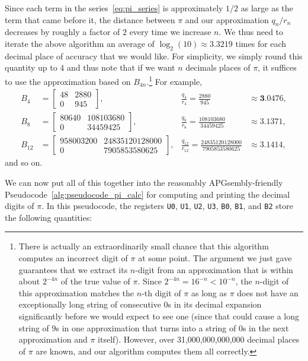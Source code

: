Since each term in the series~\eqref{eq:pi_series} is approximately $1/2$ as large as the term that came before it, the distance between $\pi$ and our approximation $q_n/r_n$ decreases by roughly a factor of $2$ every time we increase $n$. We thus need to iterate the above algorithm an average of $\log_2(10) \approx 3.3219$ times for each decimal place of accuracy that we would like. For simplicity, we simply round this quantity up to $4$ and thus note that if we want $n$ decimals places of $\pi$, it suffices to use the approximation based on $B_{4n}$.\footnote{There is actually an extraordinarily small chance that this algorithm computes an incorrect digit of $\pi$ at some point. The argument we just gave guarantees that we extract its $n$-digit from an approximation that is within about $2^{-4n}$ of the true value of $\pi$. Since $2^{-4n} = 16^{-n} < 10^{-n}$, the $n$-digit of this approximation matches the $n$-th digit of $\pi$ as long as $\pi$ does not have an exceptionally long string of consecutive $0$s in its decimal expansion significantly before we would expect to see one (since that could cause a long string of $9$s in one approximation that turns into a string of $0$s in the next approximation and $\pi$ itself). However, over 31,000,000,000,000 decimal places of $\pi$ are known, and our algorithm computes them all correctly.} For example,
\begin{align*}
B_4 & = \begin{bmatrix}
48 & 2880 \\
0 & 945
\end{bmatrix}, & \frac{q_4}{r_4} = \frac{2880}{945} & \approx \mathbf{3}.0476, \\
B_8 & = \begin{bmatrix}
80640 & 108103680 \\
0 & 34459425
\end{bmatrix}, & \frac{q_8}{r_8} = \frac{108103680}{34459425} & \approx \mathbf{3.1}371, \\
B_{12} & = \begin{bmatrix}
958003200 & 24835120128000 \\
0 & 7905853580625
\end{bmatrix}, & \frac{q_{12}}{r_{12}} = \frac{24835120128000}{7905853580625} & \approx \mathbf{3.14}14,
\end{align*}
and so on.

We can now put all of this together into the reasonably APGsembly-friendly Pseudocode~\ref{alg:pseudocode_pi_calc} for computing and printing the decimal digits of $\pi$. In this pseudocode, the registers \texttt{U0}, \texttt{U1}, \texttt{U2}, \texttt{U3}, \texttt{B0}, \texttt{B1}, and \texttt{B2} store the following quantities:\smallskip

